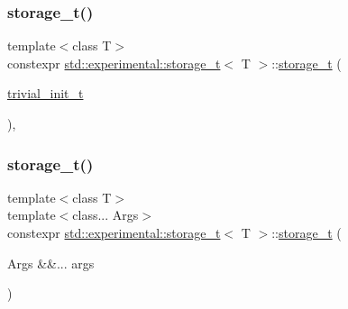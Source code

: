 \subsubsection{\texorpdfstring{storage\+\_\+t()}{storage\_t()}\hspace{0.1cm}{\footnotesize\ttfamily [1/2]}}
{\footnotesize\ttfamily template$<$class T$>$ \\
constexpr \mbox{\hyperlink{unionstd_1_1experimental_1_1storage__t}{std\+::experimental\+::storage\+\_\+t}}$<$ T $>$\+::\mbox{\hyperlink{unionstd_1_1experimental_1_1storage__t}{storage\+\_\+t}} (\begin{DoxyParamCaption}\item[{\mbox{\hyperlink{structstd_1_1experimental_1_1trivial__init__t}{trivial\+\_\+init\+\_\+t}}}]{ }\end{DoxyParamCaption})\hspace{0.3cm}{\ttfamily [inline]}, {\ttfamily [noexcept]}}

\mbox{\label{unionstd_1_1experimental_1_1storage__t_ae93191c4a215b166fe38fbafabd26449}} 
\subsubsection{\texorpdfstring{storage\+\_\+t()}{storage\_t()}\hspace{0.1cm}{\footnotesize\ttfamily [2/2]}}
{\footnotesize\ttfamily template$<$class T$>$ \\
template$<$class... Args$>$ \\
constexpr \mbox{\hyperlink{unionstd_1_1experimental_1_1storage__t}{std\+::experimental\+::storage\+\_\+t}}$<$ T $>$\+::\mbox{\hyperlink{unionstd_1_1experimental_1_1storage__t}{storage\+\_\+t}} (\begin{DoxyParamCaption}\item[{Args \&\&...}]{args }\end{DoxyParamCaption})\hspace{0.3cm}{\ttfamily [inline]}}

\mbox{\label{unionstd_1_1experimental_1_1storage__t_a9de04c8f12a996c2b9b55d430713b31e}} 
